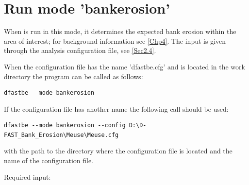 \section{Run mode 'bankerosion'}

When \dfastbe is run in this mode, it determines the expected bank erosion within the area of interest; for background information see \autoref{Chp4}.
The input is given through the analysis configuration file, see \autoref{Sec2.4}.

When the configuration file has the name 'dfastbe.cfg' and is located in the work directory the program can be called as follows:

\begin{Verbatim}
dfastbe --mode bankerosion
\end{Verbatim}

If the configuration file has another name the following call should be used:

\begin{Verbatim}
dfastbe --mode bankerosion --config D:\D-FAST_Bank_Erosion\Meuse\Meuse.cfg
\end{Verbatim}

with  the path to the directory where the configuration file is located and  the name of the configuration file.

Required input:

